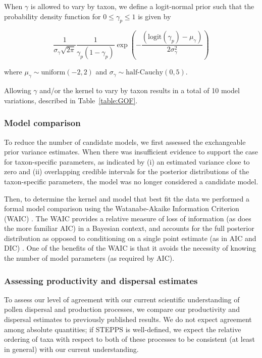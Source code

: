\documentclass[12pt]{article}
\begin{document}
When $\gamma$ is allowed to vary by taxon, we define a logit-normal
prior such that the probability density function for $0 \leq \gamma_p
\leq 1$ is given by
\begin{linenomath*}
\begin{equation}
\frac{1}{\sigma_\gamma \sqrt{2 \pi}}\frac{1}{ \gamma_p ( 1 - \gamma_p )}\exp \left(- \frac{(\text{logit}(\gamma_p) - \mu_{\gamma})}{2 \sigma_{\gamma}^2} \right)
\end{equation} 
\end{linenomath*}
where $\mu_{\gamma} \sim \text{uniform}(-2, 2)$ and $\sigma_{\gamma}
\sim \text{half-Cauchy}(0,5)$.

Allowing $\gamma$ and/or the kernel to vary by taxon results in a
total of 10 model variations, described in Table~\ref{table:GOF}. 

\subsubsection*{Model comparison}

To reduce the number of candidate models, we first assessed the
exchangeable prior variance estimates. When there was insufficient
evidence to support the case for taxon-specific parameters, as
indicated by (i) an estimated variance close to zero and (ii)
overlapping credible intervals for the posterior distributions of the
taxon-specific parameters, the model was no longer considered a
candidate model.

Then, to determine the kernel and model that best fit the data we
performed a formal model comparison using the Watanabe-Akaike
Information Criterion (WAIC) \citep{watanabe2010asymptotic}. The WAIC
provides a relative measure of loss of information (as does the more
familiar AIC) in a Bayesian context, and accounts for the full
posterior distribution as opposed to conditioning on a single point
estimate (as in AIC and DIC) \citep{gelman2014understanding}. One of
the benefits of the WAIC is that it avoids the necessity of knowing
the number of model parameters (as required by AIC).

\subsubsection*{Assessing productivity and dispersal estimates}

To assess our level of agreement with our current scientific
understanding of pollen dispersal and production processes, we compare
our productivity and dispersal estimates to previously published
results. We do not expect agreement among absolute quantities; if
STEPPS is well-defined, we expect the relative ordering of taxa with
respect to both of these processes to be consistent (at least in
general) with our current understanding.
\end{document}

